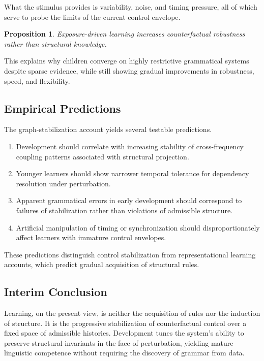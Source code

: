 \documentclass[11pt]{article}
\newtheorem{proposition}{Proposition}
\begin{document}
What the stimulus provides is variability, noise, and timing pressure, all of which serve to probe the limits of the current control envelope.

\begin{proposition}
Exposure-driven learning increases counterfactual robustness rather than structural knowledge.
\end{proposition}

This explains why children converge on highly restrictive grammatical systems despite sparse evidence, while still showing gradual improvements in robustness, speed, and flexibility.

\subsection{Empirical Predictions}

The graph-stabilization account yields several testable predictions.

\begin{enumerate}
  \item Development should correlate with increasing stability of cross-frequency coupling patterns associated with structural projection.
  \item Younger learners should show narrower temporal tolerance for dependency resolution under perturbation.
  \item Apparent grammatical errors in early development should correspond to failures of stabilization rather than violations of admissible structure.
  \item Artificial manipulation of timing or synchronization should disproportionately affect learners with immature control envelopes.
\end{enumerate}

These predictions distinguish control stabilization from representational learning accounts, which predict gradual acquisition of structural rules.

\subsection{Interim Conclusion}

Learning, on the present view, is neither the acquisition of rules nor the induction of structure. It is the progressive stabilization of counterfactual control over a fixed space of admissible histories. Development tunes the system’s ability to preserve structural invariants in the face of perturbation, yielding mature linguistic competence without requiring the discovery of grammar from data.
\end{document}
